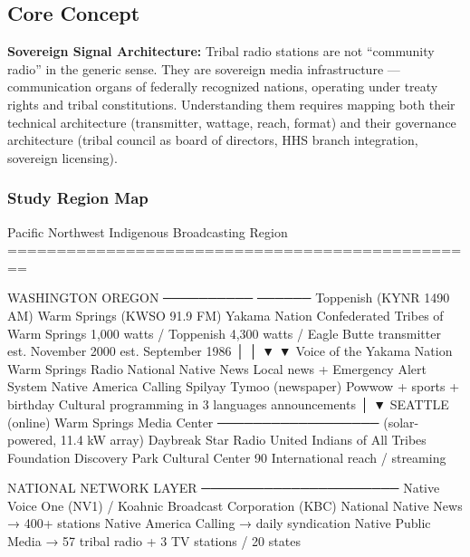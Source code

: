 \documentclass[11pt,letterpaper]{article}
\begin{document}
\subsection{Core Concept}

\textbf{Sovereign Signal Architecture:} Tribal radio stations are not ``community radio'' in the generic sense. They are sovereign media infrastructure — communication organs of federally recognized nations, operating under treaty rights and tribal constitutions. Understanding them requires mapping both their technical architecture (transmitter, wattage, reach, format) and their governance architecture (tribal council as board of directors, HHS branch integration, sovereign licensing).

\subsubsection{Study Region Map}

\begin{asciibox}
Pacific Northwest Indigenous Broadcasting Region
================================================

  WASHINGTON                         OREGON
  ──────────                         ──────
  Toppenish (KYNR 1490 AM)           Warm Springs (KWSO 91.9 FM)
  Yakama Nation                      Confederated Tribes of Warm Springs
  1,000 watts / Toppenish            4,300 watts / Eagle Butte transmitter
  est. November 2000                 est. September 1986
  │                                  │
  ▼                                  ▼
  Voice of the Yakama Nation         Warm Springs Radio
  National Native News               Local news + Emergency Alert System
  Native America Calling             Spilyay Tymoo (newspaper)
  Powwow + sports + birthday         Cultural programming in 3 languages
  announcements                      │
                                     ▼
  SEATTLE (online)            Warm Springs Media Center
  ──────────────────          (solar-powered, 11.4 kW array)
  Daybreak Star Radio
  United Indians of All
  Tribes Foundation
  Discovery Park Cultural Center
  90%
  International reach / streaming

  NATIONAL NETWORK LAYER
  ──────────────────────
  Native Voice One (NV1) / Koahnic Broadcast Corporation (KBC)
  National Native News → 400+ stations
  Native America Calling → daily syndication
  Native Public Media → 57 tribal radio + 3 TV stations / 20 states
\end{asciibox}
\end{document}
